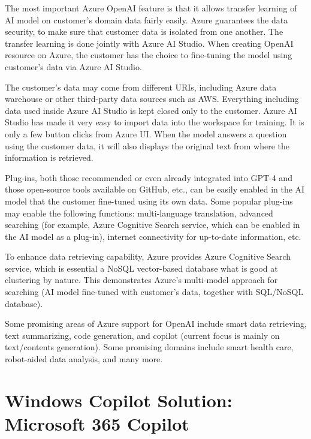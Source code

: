 The most important Azure OpenAI feature is that it allows transfer learning of AI model on customer's domain data fairly easily. Azure guarantees the data security, to make sure that customer data is isolated from one another. The transfer learning is done jointly with Azure AI Studio. When creating OpenAI resource on Azure, the customer has the choice to fine-tuning the model using customer's data via Azure AI Studio.

The customer's data may come from different URIs, including Azure data warehouse or other third-party data sources such as AWS. Everything including data used inside Azure AI Studio is kept closed only to the customer. Azure AI Studio has made it very easy to import data into the workspace for training. It is only a few button clicks from Azure UI. When the model answers a question using the customer data, it will also displays the original text from where the information is retrieved.

Plug-ins, both those recommended or even already integrated into GPT-4 and those open-source tools available on GitHub, etc., can be easily enabled in the AI model that the customer fine-tuned using its own data. Some popular plug-ins may enable the following functions: multi-language translation, advanced searching (for example, Azure Cognitive Search service, which can be enabled in the AI model as a plug-in), internet connectivity for up-to-date information, etc.

\begin{shortbox}

To enhance data retrieving capability, Azure provides Azure Cognitive Search service, which is essential a NoSQL vector-based database what is good at clustering by nature. This demonstrates Azure's multi-model approach for searching (AI model fine-tuned with customer's data, together with SQL/NoSQL database).
\end{shortbox}

Some promising areas of Azure support for OpenAI include smart data retrieving, text summarizing, code generation, and copilot (current focus is mainly on text/contents generation). Some promising domains include smart health care, robot-aided data analysis, and many more.

\section{Windows Copilot Solution: Microsoft 365 Copilot}

